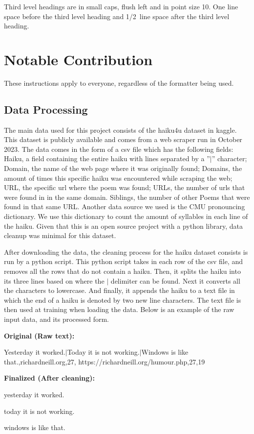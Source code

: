 \documentclass{article} %
\begin{document}
Third level headings are in small caps,
flush left and in point size 10. One line space before the third level
heading and 1/2~line space after the third level heading.

\section{Notable Contribution}
\label{others}

These instructions apply to everyone, regardless of the formatter being used.

\subsection{Data Processing}
The main data used for this project consists of the haiku4u dataset in kaggle.
This dataset is publicly available and comes from a web scraper run in October 2023.
The data comes in the form of a csv file which has the following fields:
Haiku, a field containing the entire haiku with lines separated by a ”$|$” character;
Domain, the name of the web page where it was originally found;
Domains, the amount of times this specific haiku was encountered while scraping the web;
URL, the specific url where the poem was found;
URLs, the number of urls that were found in in the same domain.
Siblings, the number of other Poems that were found in that same URL.
Another data source we used is the CMU pronouncing dictionary.
We use this dictionary to count the amount of syllables in each line of the haiku.
Given that this is an open source project with a python library, data cleanup was minimal for this dataset.


After downloading the data, the cleaning process for the haiku dataset consists is run by a python script.
This python script takes in each row of the csv file, and removes all the rows that do not contain a haiku.
Then, it splits the haiku into its three lines based on where the $|$ delimiter can be found.
Next it converts all the characters to lowercase.
And finally, it appends the haiku to a text file in which the end of a haiku is denoted by two new line characters.
The text file is then used at training when loading the data.
Below is an example of the raw input data, and its processed form.



\begin{multicols}{2}

  \textbf{Original (Raw text):} \par
  Yesterday it worked.$|$Today it is not working.$|$Windows is
  like that.,richardneill.org,27,
  https://richardneill.org/humour.php,27,19

  \columnbreak

  \raggedleft
  \textbf{Finalized (After cleaning):} \par

  \raggedleft
  yesterday it worked.

  today it is not working.

  windows is like that.
\end{multicols}
\end{document}
